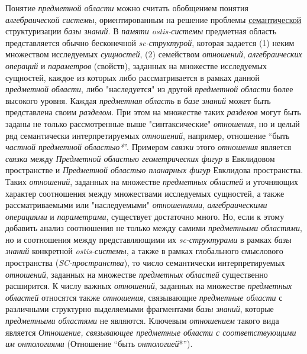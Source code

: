 \begin{SCn}
{	Понятие \textit{предметной области} можно считать обобщением понятия \textit{алгебраической системы}, ориентированным на решение проблемы \uline{семантической} структуризации \textit{базы знаний}. В \textit{памяти ostis-системы} предметная область представляется обычно бесконечной \textit{sc-структурой}, которая задается (1) неким множеством исследуемых \textit{сущностей}, (2) семейством \textit{отношений}, \textit{алгебраических операций} и \textit{параметров} (свойств), заданных на множестве исследуемых сущностей, каждое из которых либо рассматривается в рамках данной \textit{предметной области}, либо "наследуется"{} из другой \textit{предметной области} более высокого уровня. Каждая \textit{предметная область} в \textit{базе знаний} может быть представлена своим \textit{разделом}. При этом на множестве таких \textit{разделов} могут быть заданы не только рассмотренные выше "синтаксические"{} \textit{отношения}, но и целый ряд семантически интерпретируемых \textit{отношений}, например, отношение ``быть \textit{частной предметной областью*}''{}. Примером \textit{связки} этого \textit{отношения} является \textit{связка} между \textit{Предметной областью геометрических фигур} в Евклидовом пространстве и \textit{Предметной областью планарных фигур} Евклидова пространства. Таких \textit{отношений}, заданных на множестве \textit{предметных областей} и уточняющих характер соотношения между множествами исследуемых сущностей, а также рассматриваемыми или "наследуемыми"{} \textit{отношениями}, \textit{алгебраическими операциями} и \textit{параметрами}, существует достаточно много. Но, если к этому добавить анализ соотношения не только между самими \textit{предметными областями}, но и соотношения между представляющими их \textit{sc-структурами} в рамках \textit{базы знаний} конкретной \textit{ostis-системы}, а также в рамках глобального смыслового пространства (\textit{SC-пространства}), то число семантически интерпретируемых \textit{отношений}, заданных на множестве \textit{предметных областей} существенно расширится. К числу важных \textit{отношений}, заданных на множестве \textit{предметных областей} относятся также \textit{отношения}, связывающие \textit{предметные области} с различными структурно выделяемыми фрагментами \textit{базы знаний}, которые \textit{предметными областями} не являются. Ключевым \textit{отношением} такого вида является \textit{Отношение, связывающее предметные области с соответствующими им онтологиями} (Отношение ``быть \textit{онтологией}*'').} 
\newpage
{}
\end{SCn}
